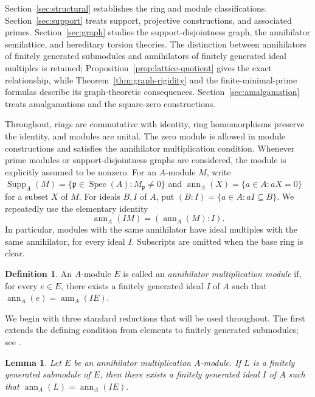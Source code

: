 \documentclass[11pt]{amsart}
\theoremstyle{plain}
\newtheorem{lemma}[theorem]{Lemma}
\theoremstyle{definition}
\newtheorem{definition}[theorem]{Definition}
\theoremstyle{remark}
\DeclareMathOperator{\Spec}{Spec}
\DeclareMathOperator{\Supp}{Supp}
\newcommand{\ann}{\operatorname{ann}}
\numberwithin{equation}{section}
\begin{document}
Section~\ref{sec:structural} establishes the ring and module classifications.
Section~\ref{sec:support} treats support, projective constructions, and
associated primes. Section~\ref{sec:graph} studies the support-disjointness
graph, the annihilator semilattice, and hereditary torsion theories.
The distinction between annihilators of finitely generated submodules and
annihilators of finitely generated ideal multiples is retained;
Proposition~\ref{prop:lattice-quotient} gives the exact relationship, while
Theorem~\ref{thm:graph-rigidity} and the finite-minimal-prime formulas describe
its graph-theoretic consequences. Section~\ref{sec:amalgamation} treats
amalgamations and the square-zero constructions.

Throughout, rings are commutative with identity, ring homomorphisms preserve
the identity, and modules are unital. The zero module is allowed in
module constructions and satisfies the annihilator multiplication condition.
Whenever prime modules or support-disjointness graphs are considered, the
module is explicitly assumed to be nonzero. For an $A$-module $M$, write
$\Supp_A(M)=\{\mathfrak p\in\Spec(A):M_{\mathfrak p}\ne0\}$ and
$\ann_A(X)=\{a\in A:aX=0\}$ for a subset $X$ of $M$.
For ideals $B,I$ of $A$, put $(B:I)=\{a\in A:aI\subseteq B\}$.
We repeatedly use the elementary identity
\begin{equation}\label{eq:colon-annihilator}
\ann_A(IM)=(\ann_A(M):I).
\end{equation}
In particular, modules with the same annihilator have ideal multiples with
the same annihilator, for every ideal $I$. Subscripts are omitted when the
base ring is clear.

\begin{definition} \cite{KocAMM}
An $A$-module $E$ is called an \emph{annihilator multiplication module} if, for
every $e\in E$, there exists a finitely generated ideal $I$ of $A$ such that
$\ann_A(e)=\ann_A(IE).$
\end{definition}

We begin with three standard reductions that will be used throughout. The first
extends the defining condition from elements to finitely generated submodules;
see \cite[Proposition 1(i)]{KocAMM}.

\begin{lemma}
\label{lem:fg-submodule}
Let $E$ be an annihilator multiplication $A$-module. If $L$ is a finitely
generated submodule of $E$, then there exists a finitely generated ideal $I$ of
$A$ such that $\ann_A(L)=\ann_A(IE).$
\end{lemma}
\end{document}
